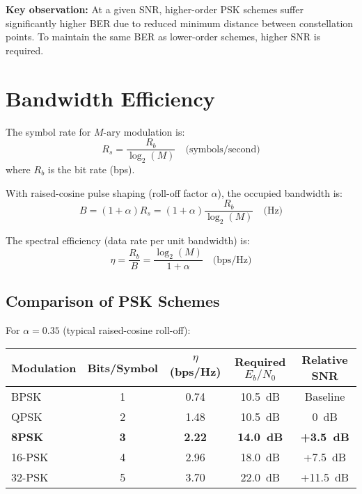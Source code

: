 \textbf{Key observation:} At a given SNR, higher-order PSK schemes suffer significantly higher BER due to reduced minimum distance between constellation points. To maintain the same BER as lower-order schemes, higher SNR is required.

\section{Bandwidth Efficiency}

The symbol rate for $M$-ary modulation is:
\begin{equation}
R_s = \frac{R_b}{\log_2(M)} \quad \text{(symbols/second)}
\end{equation}
where $R_b$ is the bit rate (bps).

With raised-cosine pulse shaping (roll-off factor $\alpha$), the occupied bandwidth is:
\begin{equation}
B = (1 + \alpha) R_s = (1 + \alpha) \frac{R_b}{\log_2(M)} \quad \text{(Hz)}
\end{equation}

The spectral efficiency (data rate per unit bandwidth) is:
\begin{equation}
\eta = \frac{R_b}{B} = \frac{\log_2(M)}{1 + \alpha} \quad \text{(bps/Hz)}
\end{equation}

\subsection{Comparison of PSK Schemes}

For $\alpha = 0.35$ (typical raised-cosine roll-off):

\begin{center}
\begin{tabular}{@{}lcccc@{}}
\toprule
Modulation & Bits/Symbol & $\eta$ (bps/Hz) & Required $E_b/N_0$ & Relative SNR \\
\midrule
BPSK & 1 & 0.74 & 10.5~dB & Baseline \\
QPSK & 2 & 1.48 & 10.5~dB & 0~dB \\
\textbf{8PSK} & \textbf{3} & \textbf{2.22} & \textbf{14.0~dB} & \textbf{+3.5~dB} \\
16-PSK & 4 & 2.96 & 18.0~dB & +7.5~dB \\
32-PSK & 5 & 3.70 & 22.0~dB & +11.5~dB \\
\bottomrule
\end{tabular}
\end{center}

